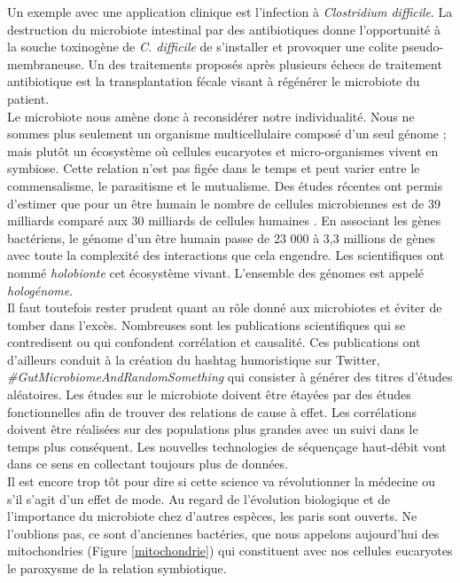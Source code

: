 \documentclass[12pt,a4paper]{article}
\begin{document}
Un exemple avec une application clinique est l'infection à \textit{Clostridium difficile}. La destruction du microbiote intestinal par des antibiotiques donne l'opportunité à la souche toxinogène de \textit{C. difficile} de s'installer et provoquer une colite pseudo-membraneuse. Un des traitements proposés après plusieurs échecs de traitement antibiotique est la transplantation fécale visant à régénérer le microbiote du patient. \\
Le microbiote nous amène donc à reconsidérer notre individualité. Nous ne sommes plus seulement un organisme multicellulaire composé d'un seul génome ; mais plutôt un écosystème où cellules eucaryotes et micro-organismes vivent en symbiose. Cette relation n'est pas figée dans le temps et peut varier entre le commensalisme, le parasitisme et le mutualisme. Des études récentes ont permis d'estimer que pour un être humain le nombre de cellules microbiennes est de 39 milliards comparé aux 30 milliards de cellules humaines \cite{Sender2016}. En associant les gènes bactériens, le génome d’un être humain passe de 23 000  à 3,3 millions de gènes \cite{Qin2010} avec toute la complexité des interactions que cela engendre. Les scientifiques ont nommé \textit{holobionte} cet écosystème vivant. L'ensemble des génomes est appelé \textit{hologénome}. \\
Il faut toutefois rester prudent quant au rôle donné aux microbiotes et éviter de tomber dans l'excès. Nombreuses sont les publications scientifiques qui se contredisent ou qui confondent corrélation et causalité. Ces publications ont d'ailleurs conduit à la création du hashtag humoristique sur Twitter, \textit{\#GutMicrobiomeAndRandomSomething} qui consister à générer des titres d'études aléatoires.
Les études sur le microbiote doivent être étayées par des études fonctionnelles afin de trouver des relations de cause à effet. Les corrélations doivent être réalisées sur des populations plus grandes avec un suivi dans le temps plus conséquent. Les nouvelles technologies de séquençage haut-débit vont dans ce sens en collectant toujours plus de données.\\
Il est encore trop tôt pour dire si cette science va révolutionner la médecine ou s’il s'agit d'un effet de mode. Au regard de l'évolution biologique et de l'importance du microbiote chez d'autres espèces, les paris sont ouverts. Ne l'oublions pas, ce sont d'anciennes bactéries, que nous appelons aujourd'hui des mitochondries (Figure \ref{mitochondrie}) qui constituent avec nos cellules eucaryotes le paroxysme de la relation symbiotique. 
\end{document}
